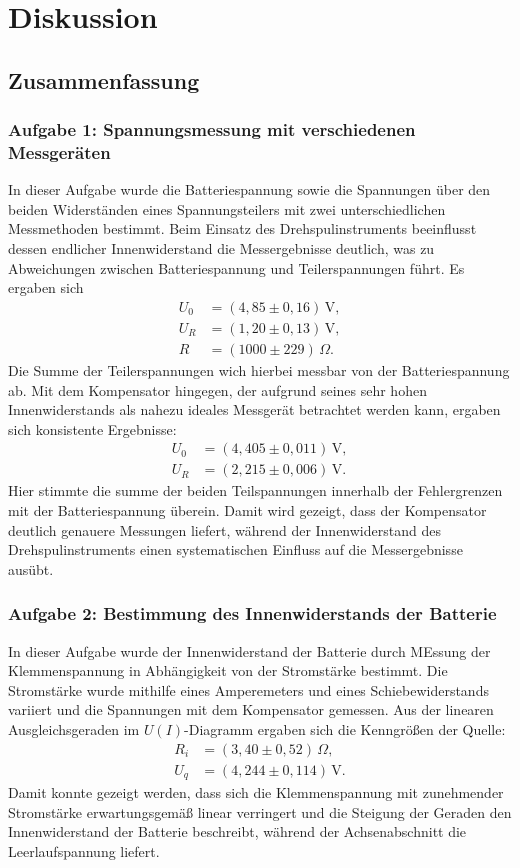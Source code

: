 \chapter{Diskussion}

\section{Zusammenfassung}
\subsection*{Aufgabe 1: Spannungsmessung mit verschiedenen Messgeräten}
In dieser Aufgabe wurde die Batteriespannung sowie die Spannungen über den beiden Widerständen eines Spannungsteilers mit zwei unterschiedlichen Messmethoden bestimmt. Beim Einsatz des Drehspulinstruments beeinflusst dessen endlicher Innenwiderstand die Messergebnisse deutlich, was zu Abweichungen zwischen Batteriespannung und Teiler­spannungen führt. Es ergaben sich
\begin{align*}
U_0 &= (4,85 \pm 0,16)\,\text{V}, \\
U_R &= (1,20 \pm 0,13)\,\text{V}, \\ 
R &= (1000 \pm 229)\,\Omega.
\end{align*}
Die Summe der Teilerspannungen wich hierbei messbar von der Batteriespannung ab.  
Mit dem Kompensator hingegen, der aufgrund seines sehr hohen Innenwiderstands als nahezu ideales Messgerät betrachtet werden kann, ergaben sich konsistente Ergebnisse:
\begin{align*}
    U_0 &= (4,405 \pm 0,011)\,\text{V}, \\
    U_R &= (2,215 \pm 0,006)\,\text{V}.
\end{align*}
Hier stimmte die summe der beiden Teilspannungen innerhalb der Fehlergrenzen mit der Batteriespannung überein. Damit wird gezeigt, dass der Kompensator deutlich genauere Messungen liefert, während der Innenwiderstand des Drehspulinstruments einen systematischen Einfluss auf die Messergebnisse ausübt.

\subsection*{Aufgabe 2: Bestimmung des Innenwiderstands der Batterie}
In dieser Aufgabe wurde der Innenwiderstand der Batterie durch MEssung der Klemmenspannung in Abhängigkeit von der Stromstärke bestimmt. Die Stromstärke wurde mithilfe eines Amperemeters und eines Schiebewiderstands variiert und die Spannungen mit dem Kompensator gemessen. Aus der linearen Ausgleichsgeraden im $U(I)$-Diagramm ergaben sich die Kenngrößen der Quelle:
\begin{align*}
    R_i &= (3,40 \pm 0,52)\,\Omega, \\
    U_q &= (4,244 \pm 0,114)\,\text{V}.
\end{align*}
Damit konnte gezeigt werden, dass sich die Klemmenspannung mit zunehmender Stromstärke erwartungsgemäß linear verringert und die Steigung der Geraden den Innenwiderstand der Batterie beschreibt, während der Achsenabschnitt die Leerlaufspannung liefert.

